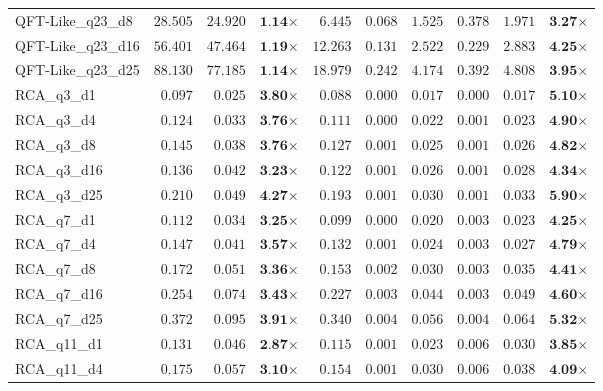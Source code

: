\begin{table*}[t]
{\begin{tabular}{| l || r r c || r r r r r c |}
QFT-Like\_q23\_d8 & $28.505$ & $24.920$ & $\textbf{1.14}$$\times$ & $6.445$ & $0.068$ & $1.525$ & $0.378$ & $1.971$ & $\textbf{3.27}$$\times$ \\
QFT-Like\_q23\_d16 & $56.401$ & $47.464$ & $\textbf{1.19}$$\times$ & $12.263$ & $0.131$ & $2.522$ & $0.229$ & $2.883$ & $\textbf{4.25}$$\times$ \\
QFT-Like\_q23\_d25 & $88.130$ & $77.185$ & $\textbf{1.14}$$\times$ & $18.979$ & $0.242$ & $4.174$ & $0.392$ & $4.808$ & $\textbf{3.95}$$\times$ \\
RCA\_q3\_d1 & $0.097$ & $0.025$ & $\textbf{3.80}$$\times$ & $0.088$ & $0.000$ & $0.017$ & $0.000$ & $0.017$ & $\textbf{5.10}$$\times$ \\
RCA\_q3\_d4 & $0.124$ & $0.033$ & $\textbf{3.76}$$\times$ & $0.111$ & $0.000$ & $0.022$ & $0.001$ & $0.023$ & $\textbf{4.90}$$\times$ \\
RCA\_q3\_d8 & $0.145$ & $0.038$ & $\textbf{3.76}$$\times$ & $0.127$ & $0.001$ & $0.025$ & $0.001$ & $0.026$ & $\textbf{4.82}$$\times$ \\
RCA\_q3\_d16 & $0.136$ & $0.042$ & $\textbf{3.23}$$\times$ & $0.122$ & $0.001$ & $0.026$ & $0.001$ & $0.028$ & $\textbf{4.34}$$\times$ \\
RCA\_q3\_d25 & $0.210$ & $0.049$ & $\textbf{4.27}$$\times$ & $0.193$ & $0.001$ & $0.030$ & $0.001$ & $0.033$ & $\textbf{5.90}$$\times$ \\
RCA\_q7\_d1 & $0.112$ & $0.034$ & $\textbf{3.25}$$\times$ & $0.099$ & $0.000$ & $0.020$ & $0.003$ & $0.023$ & $\textbf{4.25}$$\times$ \\
RCA\_q7\_d4 & $0.147$ & $0.041$ & $\textbf{3.57}$$\times$ & $0.132$ & $0.001$ & $0.024$ & $0.003$ & $0.027$ & $\textbf{4.79}$$\times$ \\
RCA\_q7\_d8 & $0.172$ & $0.051$ & $\textbf{3.36}$$\times$ & $0.153$ & $0.002$ & $0.030$ & $0.003$ & $0.035$ & $\textbf{4.41}$$\times$ \\
RCA\_q7\_d16 & $0.254$ & $0.074$ & $\textbf{3.43}$$\times$ & $0.227$ & $0.003$ & $0.044$ & $0.003$ & $0.049$ & $\textbf{4.60}$$\times$ \\
RCA\_q7\_d25 & $0.372$ & $0.095$ & $\textbf{3.91}$$\times$ & $0.340$ & $0.004$ & $0.056$ & $0.004$ & $0.064$ & $\textbf{5.32}$$\times$ \\
RCA\_q11\_d1 & $0.131$ & $0.046$ & $\textbf{2.87}$$\times$ & $0.115$ & $0.001$ & $0.023$ & $0.006$ & $0.030$ & $\textbf{3.85}$$\times$ \\
RCA\_q11\_d4 & $0.175$ & $0.057$ & $\textbf{3.10}$$\times$ & $0.154$ & $0.001$ & $0.030$ & $0.006$ & $0.038$ & $\textbf{4.09}$$\times$ \\

\end{tabular}}
\end{table*}
